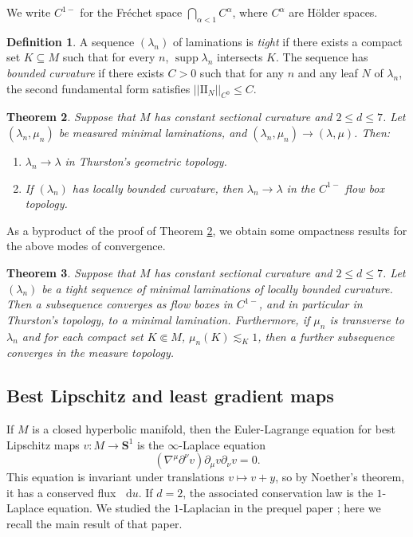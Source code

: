 \documentclass[reqno,11pt]{amsart}
\newcommand{\Sph}{\mathbf S}
\newcommand*\dif{\mathop{}\!\mathrm{d}}
\DeclareMathOperator{\supp}{supp}
\newcommand{\Two}{\mathrm{I\!I}}
\newcommand{\dfn}[1]{\emph{#1}\index{#1}}
\newtheorem{theorem}{Theorem}[section]
\theoremstyle{definition}
\newtheorem{definition}[theorem]{Definition}
\numberwithin{equation}{section}
\begin{document}
We write $C^{1-}$ for the Fr\'echet space $\bigcap_{\alpha < 1} C^\alpha$, where $C^\alpha$ are H\"older spaces.

\begin{definition}
A sequence $(\lambda_n)$ of laminations is \dfn{tight} if there exists a compact set $K \subseteq M$ such that for every $n$, $\supp \lambda_n$ intersects $K$.
The sequence has \dfn{bounded curvature} if there exists $C > 0$ such that for any $n$ and any leaf $N$ of $\lambda_n$, the second fundamental form satisfies $||\Two_N||_{C^0} \leq C$.
\end{definition}

\begin{theorem}\label{implication theorem}
Suppose that $M$ has constant sectional curvature and $2 \leq d \leq 7$.
Let $(\lambda_n, \mu_n)$ be measured minimal laminations, and $(\lambda_n, \mu_n) \to (\lambda, \mu)$.
Then:
\begin{enumerate}
	\item $\lambda_n \to \lambda$ in Thurston's geometric topology.
	\item If $(\lambda_n)$ has locally bounded curvature, then $\lambda_n \to \lambda$ in the $C^{1-}$ flow box topology.
\end{enumerate}
\end{theorem}

As a byproduct of the proof of Theorem \ref{implication theorem}, we obtain some ompactness results for the above modes of convergence.

\begin{theorem}\label{compactness theorem}
Suppose that $M$ has constant sectional curvature and $2 \leq d \leq 7$.
Let $(\lambda_n)$ be a tight sequence of minimal laminations of locally bounded curvature.
Then a subsequence converges as flow boxes in $C^{1-}$, and in particular in Thurston's topology, to a minimal lamination.
Furthermore, if $\mu_n$ is transverse to $\lambda_n$ and for each compact set $K \Subset M$, $\mu_n(K) \lesssim_K 1$, then a further subsequence converges in the measure topology.
\end{theorem}



\subsection{Best Lipschitz and least gradient maps}\label{FLG section}
If $M$ is a closed hyperbolic manifold, then the Euler-Lagrange equation for best Lipschitz maps $v: M \to \Sph^1$ is the $\infty$-Laplace equation \cite{daskalopoulos2020transverse}
\begin{equation}\label{infinity laplacian}
(\nabla^\mu \partial^\nu v) \partial_\mu v \partial_\nu v = 0.
\end{equation}
This equation is invariant under translations $v \mapsto v + y$, so by Noether's theorem, it has a conserved flux $\dif u$.
If $d = 2$, the associated conservation law is the $1$-Laplace equation.
We studied the $1$-Laplacian in the prequel paper \cite{BackusFLG}; here we recall the main result of that paper.
\end{document}
